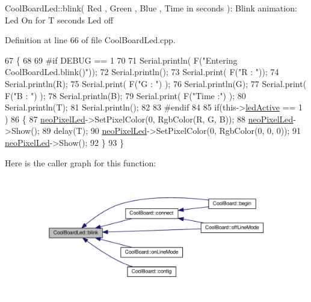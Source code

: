 Cool\+Board\+Led\+::blink( Red , Green , Blue , Time in seconds )\+: Blink animation\+: Led On for T seconds Led off 

Definition at line 66 of file Cool\+Board\+Led.\+cpp.


\begin{DoxyCode}
67 \{
68 
69 \textcolor{preprocessor}{#if DEBUG == 1}
70 
71     Serial.println( F(\textcolor{stringliteral}{"Entering CoolBoardLed.blink()"}));
72     Serial.println();
73     Serial.print( F(\textcolor{stringliteral}{"R : "}));
74     Serial.println(R);
75     Serial.print( F(\textcolor{stringliteral}{"G : "}) );
76     Serial.println(G);
77     Serial.print( F(\textcolor{stringliteral}{"B : "}) );
78     Serial.println(B);
79     Serial.print( F(\textcolor{stringliteral}{"Time :"}) );
80     Serial.println(T);
81     Serial.println();
82 
83 \textcolor{preprocessor}{#endif  }
84 
85     \textcolor{keywordflow}{if}(this->\hyperlink{class_cool_board_led_a5f17c135516fcf4b44ea8a096ba0177a}{ledActive} == 1 )
86     \{
87         \hyperlink{class_cool_board_led_ac2c13fa462a010cd9242bf297c013923}{neoPixelLed}->SetPixelColor(0, RgbColor(R, G, B));
88         \hyperlink{class_cool_board_led_ac2c13fa462a010cd9242bf297c013923}{neoPixelLed}->Show();
89         delay(T);
90         \hyperlink{class_cool_board_led_ac2c13fa462a010cd9242bf297c013923}{neoPixelLed}->SetPixelColor(0, RgbColor(0, 0, 0));
91         \hyperlink{class_cool_board_led_ac2c13fa462a010cd9242bf297c013923}{neoPixelLed}->Show();
92     \}
93 \}
\end{DoxyCode}
Here is the caller graph for this function\+:\nopagebreak
\begin{figure}[H]
\begin{center}
\leavevmode
\includegraphics[width=350pt]{de/dc0/class_cool_board_led_a96e1ea13003eee34c9dbcef340404426_icgraph}
\end{center}
\end{figure}
\mbox{\label{class_cool_board_led_a1b60e5e30bea96c49ed62ed1bf1ffc8b}} 
